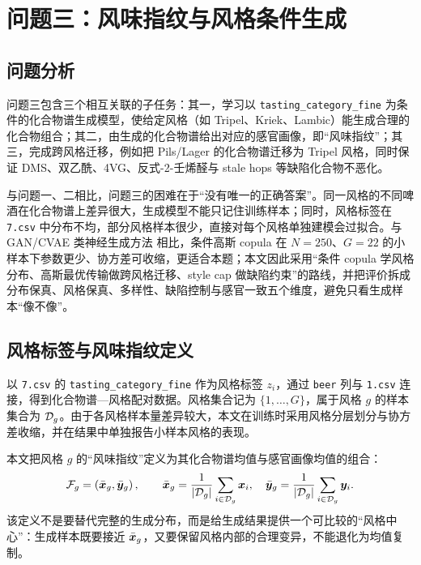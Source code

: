 
\section{问题三：风味指纹与风格条件生成}
\label{sec:q3}

\subsection{问题分析}

问题三包含三个相互关联的子任务：其一，学习以 \texttt{tasting\_category\_fine} 为条件的化合物谱生成模型，使给定风格（如 Tripel、Kriek、Lambic）能生成合理的化合物组合；其二，由生成的化合物谱给出对应的感官画像，即“风味指纹”；其三，完成跨风格迁移，例如把 Pils/Lager 的化合物谱迁移为 Tripel 风格，同时保证 DMS、双乙酰、4VG、反式-2-壬烯醛与 stale hops 等缺陷化合物不恶化。

与问题一、二相比，问题三的困难在于“没有唯一的正确答案”。同一风格的不同啤酒在化合物谱上差异很大，生成模型不能只记住训练样本；同时，风格标签在 \texttt{7.csv} 中分布不均，部分风格样本很少，直接对每个风格单独建模会过拟合。与 GAN/CVAE 类神经生成方法\citep{goodfellow2014generative,mirza2014conditional} 相比，条件高斯 copula 在 $N=250$、$G=22$ 的小样本下参数更少、协方差可收缩，更适合本题；本文因此采用“条件 copula 学风格分布、高斯最优传输做跨风格迁移、style cap 做缺陷约束”的路线，并把评价拆成分布保真、风格保真、多样性、缺陷控制与感官一致五个维度，避免只看生成样本“像不像”。

\subsection{风格标签与风味指纹定义}

以 \texttt{7.csv} 的 \texttt{tasting\_category\_fine} 作为风格标签 $z_i$，通过 \texttt{beer} 列与 \texttt{1.csv} 连接，得到化合物谱—风格配对数据。风格集合记为 $\{1,\dots,G\}$，属于风格 $g$ 的样本集合为 $\mathcal{D}_g$。由于各风格样本量差异较大，本文在训练时采用风格分层划分与协方差收缩，并在结果中单独报告小样本风格的表现。

本文把风格 $g$ 的“风味指纹”定义为其化合物谱均值与感官画像均值的组合：
\begin{equation}
  \mathcal{F}_g=\left(\bar{\bm{x}}_g,\bar{\bm{y}}_g\right),\qquad
  \bar{\bm{x}}_g=\frac{1}{\left\lvert \mathcal{D}_g \right\rvert}\sum_{i\in\mathcal{D}_g}\bm{x}_i,\quad
  \bar{\bm{y}}_g=\frac{1}{\left\lvert \mathcal{D}_g \right\rvert}\sum_{i\in\mathcal{D}_g}\bm{y}_i.
  \label{eq:q3-fingerprint}
\end{equation}
该定义不是要替代完整的生成分布，而是给生成结果提供一个可比较的“风格中心”：生成样本既要接近 $\bar{\bm{x}}_g$，又要保留风格内部的合理变异，不能退化为均值复制。

